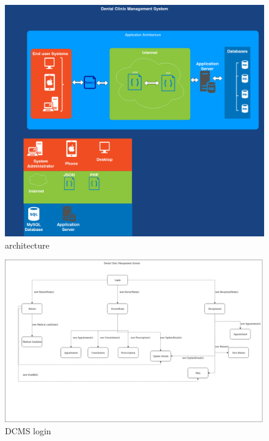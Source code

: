 \documentclass[11 pt]{article}
\begin{document}
    \begin{figure}[h]
    \centering
    
    \includegraphics[width=1.2\linewidth]{architecture.png}
    \caption{architecture}
    \end{figure}
    \begin{figure}[h]
    
    \includegraphics[width=1.2\linewidth, left]{Logical_view.png}
    \caption{DCMS login}
    \label{fig:login}
    \end{figure}
    \newpage
\end{document}
